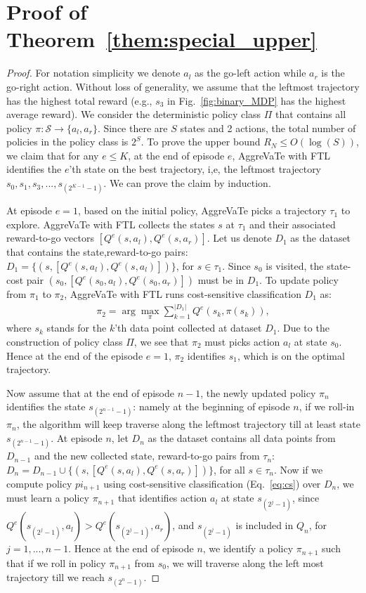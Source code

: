 \documentclass{article}
\begin{document}
\section{Proof of Theorem~\ref{them:special_upper}}
\label{sec:special_upper}
\begin{proof}
For notation simplicity we denote $a_l$ as the go-left action while $a_r$ is the go-right action. Without loss of generality, we assume that the leftmost trajectory has the highest total reward (e.g., $s_3$ in Fig.~\ref{fig:binary_MDP} has the highest average reward).
We consider the deterministic policy class $\Pi$ that contains all policy $\pi: \mathcal{S}\to \{a_l,a_r\}$. Since there are $S$ states and 2 actions, the total number of policies in the policy class is $2^S$. To prove the upper bound $R_N\leq O(\log(S))$, we claim that for any $e\leq K$, at the end of episode $e$, AggreVaTe with FTL identifies the $e$'th state on the best trajectory, i,e, the leftmost trajectory $s_0, s_1, s_3, ..., s_{(2^{K-1}-1)}$. We can prove the claim by induction. 

At episode $e=1$, based on the initial policy, AggreVaTe picks a trajectory $\tau_1$ to explore. %
AggreVaTe with FTL collects the states $s$ at $\tau_1$ and their associated reward-to-go vectors $[Q^e(s,a_l), Q^e(s,a_r)]$. Let us denote $D_1$ as the dataset that contains the state,reward-to-go pairs: $D_1 = \{(s, [Q^e(s,a_l),Q^e(s,a_l)])\}$, for $s\in \tau_1$. Since $s_0$ is visited, the state-cost pair $(s_0, [Q^e(s_0,a_l),Q^e(s_0,a_r)])$ must be in $D_1$. To update policy from $\pi_1$ to $\pi_2$, AggreVaTe with FTL runs cost-sensitive classification $D_1$ as:
\begin{align}
\label{eq:cs}
\pi_2 = \arg\max_{\pi}\sum_{k=1}^{|D_1|} Q^e(s_k, \pi(s_k)),
\end{align} where $s_k$ stands for the $k$'th data point collected at dataset $D_1$. Due to the construction of policy class $\Pi$, we see that $\pi_2$ must picks action $a_l$ at state $s_0$. Hence at the end of the episode $e=1$, $\pi_2$ identifies $s_1$, which is on the optimal trajectory.  

Now assume that at the end of episode $n-1$, the newly updated policy $\pi_{n}$ identifies the state $s_{(2^{n-1}-1)}$: namely at the beginning of episode $n$, if we roll-in $\pi_n$, the algorithm will keep traverse along the leftmost trajectory till at least state $s_{(2^{n-1}-1)}$. At episode $n$, let $D_n$ as the dataset contains all data points from $D_{n-1}$ and the new collected state, reward-to-go pairs from $\tau_n$: $D_n = D_{n-1}\cup \{(s, [Q^e(s,a_l),Q^e(s,a_r)])\} $, for all $s\in\tau_n$. Now if we compute policy $pi_{n+1}$ using cost-sensitive classification (Eq.~\ref{eq:cs}) over $D_n$, we must learn a policy $\pi_{n+1}$ that identifies action $a_l$ at state $s_{(2^{j}-1)}$, since $Q^{e}(s_{(2^{j}-1)}, a_l)> Q^e(s_{(2^{j}-1)}, a_r)$, and $s_{(2^j - 1)}$ is included in $Q_n$, for $j=1,..., n-1$.  Hence at the end of episode $n$, we identify a policy $\pi_{n+1}$ such that if we roll in policy $\pi_{n+1}$ from $s_0$, we will traverse along the left most trajectory till we reach $s_{(2^n-1)}$.  


\end{proof}
\end{document}
